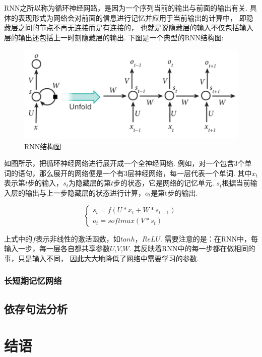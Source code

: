 \documentclass[bachelor,winfonts]{jnuthesis}
\begin{document}
RNN之所以称为循环神经网路，是因为一个序列当前的输出与前面的输出有关.
具体的表现形式为网络会对前面的信息进行记忆并应用于当前输出的计算中，
即隐藏层之间的节点不再无连接而是有连接的，
也就是说隐藏层的输入不仅包括输入层的输出还包括上一时刻隐藏层的输出.
下图是一个典型的RNN结构图:

\begin{figure}[h!]
  \centering
  \includegraphics[width=0.6\linewidth]{RNN.png}
  \caption{RNN结构图}
\end{figure}

如图所示，把循环神经网络进行展开成一个全神经网络.
例如，对一个包含3个单词的语句，那么展开的网络便是一个有3层神经网络，每一层代表一个单词.
其中$x_{t}$表示第$t$步的输入，$s_{t}$为隐藏层的第$t$步的状态，它是网络的记忆单元.
$s_{t}$根据当前输入层的输出与上一步隐藏层的状态进行计算，$o_{t}$是第t步的输出.

\begin{equation}
  \left\{
  \begin{array}{l}
    s_{t} = f(U*x_{t}+W*s_{t-1}) \\
    o_{t} = softmax(V*s_{t})
  \end{array}
  \right.
\end{equation}

上式中的$f$表示非线性的激活函数，如$tanh$，$ReLU$.
需要注意的是：在RNN中，每输入一步，每一层各自都共享参数$U$,$V$,$W$.
其反映着RNN中的每一步都在做相同的事，只是输入不同，
因此大大地降低了网络中需要学习的参数.



\subsection{长短期记忆网络}


\section{依存句法分析}

\chapter{结语}
\end{document}
